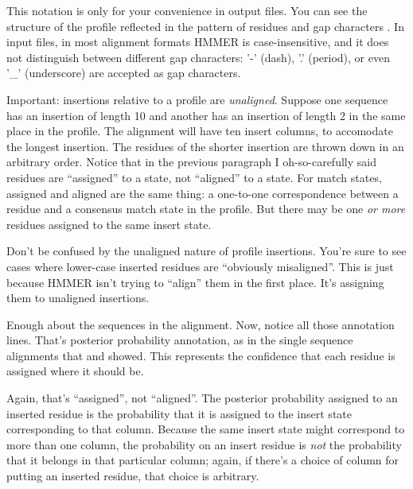 This notation is only for your convenience in output files. You can
see the structure of the profile reflected in the pattern of
residues and gap characters .  In input files, in
most alignment formats HMMER is
case-insensitive, and it does not distinguish between different gap
characters: '-' (dash), '.' (period), or even '\_' (underscore) are
accepted as gap characters.

Important: insertions relative to a profile are
\emph{unaligned}. Suppose one sequence has an insertion of length 10
and another has an insertion of length 2 in the same place in the
profile. The alignment will have ten insert columns, to accomodate the
longest insertion.  The residues of the shorter insertion are thrown
down in an arbitrary order.  Notice that in the previous paragraph I oh-so-carefully
said residues are ``assigned'' to a state, not ``aligned'' to a
state. For match states, assigned and aligned are the same thing: a
one-to-one correspondence between a residue and a consensus match
state in the profile. But there may be one \emph{or more} residues
assigned to the same insert state.

Don't be confused by the unaligned nature of profile 
insertions. You're sure to see cases where lower-case inserted
residues are ``obviously misaligned''.  This is just because HMMER
isn't trying to ``align'' them in the first place. It's assigning
them to unaligned insertions.

Enough about the sequences in the alignment. Now, notice all those
 annotation lines. That's posterior probability annotation,
as in the single sequence alignments that  and
 showed. This represents the confidence that each
residue is assigned where it should be.

Again, that's ``assigned'', not ``aligned''. The posterior probability
assigned to an inserted residue is the probability that it is assigned
to the insert state corresponding to that column. Because the same
insert state might correspond to more than one column, the probability
on an insert residue is \emph{not} the probability that it belongs in
that particular column; again, if there's a choice of column for
putting an inserted residue, that choice is arbitrary.

